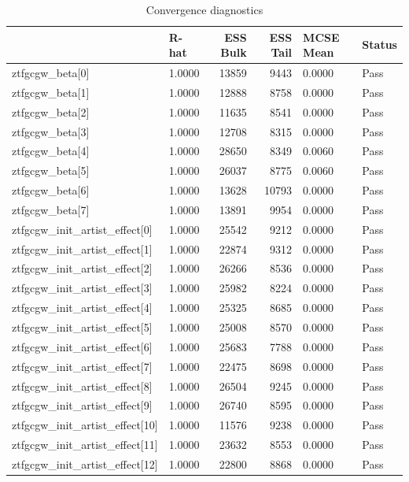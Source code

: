 \begin{table}[htbp]
\caption{Convergence diagnostics}
\label{tab:diagnostics}
\begin{tabular}{llrrll}
\toprule
 & R-hat & ESS Bulk & ESS Tail & MCSE Mean & Status \\
\midrule
ztfgcgw\_beta[0] & 1.0000 & 13859 & 9443 & 0.0000 & Pass \\
ztfgcgw\_beta[1] & 1.0000 & 12888 & 8758 & 0.0000 & Pass \\
ztfgcgw\_beta[2] & 1.0000 & 11635 & 8541 & 0.0000 & Pass \\
ztfgcgw\_beta[3] & 1.0000 & 12708 & 8315 & 0.0000 & Pass \\
ztfgcgw\_beta[4] & 1.0000 & 28650 & 8349 & 0.0060 & Pass \\
ztfgcgw\_beta[5] & 1.0000 & 26037 & 8775 & 0.0060 & Pass \\
ztfgcgw\_beta[6] & 1.0000 & 13628 & 10793 & 0.0000 & Pass \\
ztfgcgw\_beta[7] & 1.0000 & 13891 & 9954 & 0.0000 & Pass \\
ztfgcgw\_init\_artist\_effect[0] & 1.0000 & 25542 & 9212 & 0.0000 & Pass \\
ztfgcgw\_init\_artist\_effect[1] & 1.0000 & 22874 & 9312 & 0.0000 & Pass \\
ztfgcgw\_init\_artist\_effect[2] & 1.0000 & 26266 & 8536 & 0.0000 & Pass \\
ztfgcgw\_init\_artist\_effect[3] & 1.0000 & 25982 & 8224 & 0.0000 & Pass \\
ztfgcgw\_init\_artist\_effect[4] & 1.0000 & 25325 & 8685 & 0.0000 & Pass \\
ztfgcgw\_init\_artist\_effect[5] & 1.0000 & 25008 & 8570 & 0.0000 & Pass \\
ztfgcgw\_init\_artist\_effect[6] & 1.0000 & 25683 & 7788 & 0.0000 & Pass \\
ztfgcgw\_init\_artist\_effect[7] & 1.0000 & 22475 & 8698 & 0.0000 & Pass \\
ztfgcgw\_init\_artist\_effect[8] & 1.0000 & 26504 & 9245 & 0.0000 & Pass \\
ztfgcgw\_init\_artist\_effect[9] & 1.0000 & 26740 & 8595 & 0.0000 & Pass \\
ztfgcgw\_init\_artist\_effect[10] & 1.0000 & 11576 & 9238 & 0.0000 & Pass \\
ztfgcgw\_init\_artist\_effect[11] & 1.0000 & 23632 & 8553 & 0.0000 & Pass \\
ztfgcgw\_init\_artist\_effect[12] & 1.0000 & 22800 & 8868 & 0.0000 & Pass \\

\end{tabular}
\end{table}
